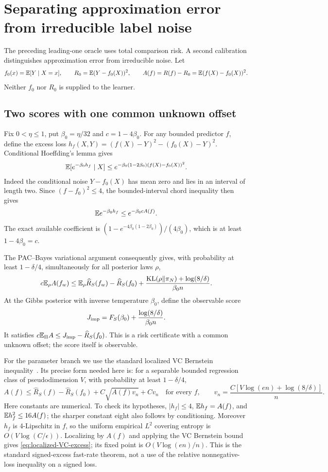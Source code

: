 \section{Separating approximation error from irreducible label noise}
\label{sec:excess-oracle}
The preceding leading-one oracle uses total comparison risk. A second calibration distinguishes approximation error from irreducible noise. Let
\[
 f_0(x)=\mathbb E[Y\mid X=x],\qquad
 R_0=\mathbb E(Y-f_0(X))^2,\qquad
 A(f)=R(f)-R_0=\mathbb E(f(X)-f_0(X))^2.
\]
Neither $f_0$ nor $R_0$ is supplied to the learner.

\subsection{Two scores with one common unknown offset}
Fix $0<\eta\le1$, put $\beta_0=\eta/32$ and $c=1-4\beta_0$. For any bounded predictor $f$, define the excess loss
$h_f(X,Y)=(f(X)-Y)^2-(f_0(X)-Y)^2$.
Conditional Hoeffding's lemma gives
\[
 \mathbb E[e^{-\beta_0h_f}\mid X]
 \le e^{-\beta_0(1-2\beta_0)(f(X)-f_0(X))^2}.
\]
Indeed the conditional noise $Y-f_0(X)$ has mean zero and lies in an interval of length two. Since $(f-f_0)^2\le4$, the bounded-interval chord inequality then gives
\[
 \mathbb E e^{-\beta_0h_f}\le e^{-\beta_0cA(f)}.
\]
The exact available coefficient is
$(1-e^{-4\beta_0(1-2\beta_0)})/(4\beta_0)$, which is at least $1-4\beta_0=c$.

The PAC--Bayes variational argument consequently gives, with probability at least $1-\delta/4$, simultaneously for all posterior laws $\rho$,
\[
 c\mathbb E_\rho A(f_w)\le\mathbb E_\rho\widehat R_S(f_w)-\widehat R_S(f_0)
              +\frac{\operatorname{KL}(\rho\Vert\pi_N)+\log(8/\delta)}{\beta_0 n}.
\]
At the Gibbs posterior with inverse temperature $\beta_0$, define the observable score
\begin{equation}
 J_{\rm imp}=F_S(\beta_0)+\frac{\log(8/\delta)}{\beta_0 n}.
 \label{eq:Student-excess-implicit-score}
\end{equation}
It satisfies $c\mathbb E_\Pi A\le J_{\rm imp}-\widehat R_S(f_0)$. This is a risk certificate with a common unknown offset; the score itself is observable.

For the parameter branch we use the standard localized VC Bernstein inequality~\cite{localrad}. Its precise form needed here is: for a separable bounded regression class of pseudodimension $V$, with probability at least $1-\delta/4$,
\begin{equation}
 A(f)\le\widehat R_S(f)-\widehat R_S(f_0)
              +C\sqrt{A(f)v_n}+Cv_n\quad\text{for every }f,
 \qquad v_n=\frac{C[V\log(en)+\log(8/\delta)]}{n}.
 \label{eq:localized-VC-excess}
\end{equation}
Here constants are numerical. To check its hypotheses, $|h_f|\le4$, $\mathbb E h_f=A(f)$, and $\mathbb E h_f^2\le16A(f)$; the sharper constant eight also follows by conditioning. Moreover $h_f$ is 4-Lipschitz in $f$, so the uniform empirical $L^2$ covering entropy is $O(V\log(C/\epsilon))$. Localizing by $A(f)$ and applying the VC Bernstein bound gives \eqref{eq:localized-VC-excess}; its fixed point is $O(V\log(en)/n)$. This is the standard signed-excess fast-rate theorem, not a use of the relative nonnegative-loss inequality on a signed loss.

